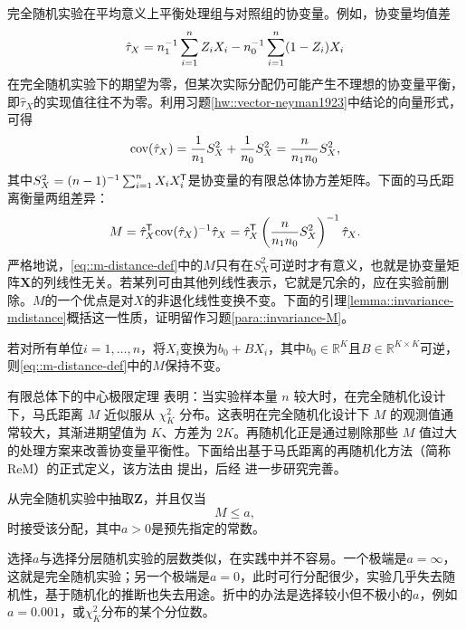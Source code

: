 完全随机实验在平均意义上平衡处理组与对照组的协变量。例如，协变量均值差
$$
\hat{\tau}_X  = n_1^{-1} \sum_{i=1}^n Z_i X_i - n_0^{-1} \sum_{i=1}^n (1-Z_i) X_i
$$
在完全随机实验下的期望为零，但某次实际分配仍可能产生不理想的协变量平衡，即$\hat{\tau}_X  $的实现值往往不为零。利用习题\ref{hw::vector-neyman1923}中\citet{Neyman:1923}结论的向量形式，可得
$$
\textup{cov}(\hat{\tau}_X  ) 
= \frac{1}{n_1}  S_X^2  + \frac{1}{n_0}  S_X^2   
=  \frac{n}{n_1 n_0} S_X^2   ,
$$
其中$ S_X^2   = (n-1)^{-1} \sum_{i=1}^n  X_i X_i^{\mkern-1.5mu\mathsf{T}} $是协变量的有限总体协方差矩阵。下面的马氏距离衡量两组差异：
\begin{equation}
\label{eq::m-distance-def}
M = \hat{\tau}_X ^{\mkern-1.5mu\mathsf{T}} \textup{cov}(\hat{\tau}_X  )^{-1} \hat{\tau}_X  = \hat{\tau}_X ^{\mkern-1.5mu\mathsf{T}}  \left(  \frac{n}{n_1 n_0} S_X^2   \right)^{-1} \hat{\tau}_X  . 
\end{equation}
严格地说，\eqref{eq::m-distance-def}中的$M$只有在$S_X^2 $可逆时才有意义，也就是协变量矩阵$\bm{X}$的列线性无关。若某列可由其他列线性表示，它就是冗余的，应在实验前删除。$M$的一个优点是对$X$的非退化线性变换不变。下面的引理\ref{lemma::invariance-mdistance}概括这一性质，证明留作习题\ref{para::invariance-M}。 

\begin{lemma}\label{lemma::invariance-mdistance}
若对所有单位$i=1,\ldots, n$，将$X_i$变换为$b_0  + BX_i$，其中$b_0  \in \mathbb{R}^K$且$B \in \mathbb{R}^{K\times K}$可逆，则\eqref{eq::m-distance-def}中的$M$保持不变。 
\end{lemma}




有限总体下的中心极限定理 \citep{li2017general} 表明：当实验样本量 $n$ 较大时，在完全随机化设计下，马氏距离 $M $ 近似服从 $ \chi^2_K$ 分布。这表明在完全随机化设计下 $M$ 的观测值通常较大，其渐进期望值为 $K$、方差为 $2K$。再随机化正是通过剔除那些 $M$ 值过大的处理方案来改善协变量平衡性。下面给出基于马氏距离的再随机化方法（简称 ReM）的正式定义，该方法由 \citet{cox:1982} 提出，后经 \citet{morgan2012rerandomization} 进一步研究完善。 


\begin{definition}
[ReM]
从完全随机实验中抽取$\bm{Z}$，并且仅当
$$
M \leq a,
$$
时接受该分配，其中$a > 0$是预先指定的常数。 
\end{definition}



选择$a$与选择分层随机实验的层数类似，在实践中并不容易。一个极端是$a = \infty$，这就是完全随机实验；另一个极端是$a=0$，此时可行分配很少，实验几乎失去随机性，基于随机化的推断也失去用途。折中的办法是选择较小但不极小的$a$，例如$a=0.001$，或$\chi^2_K$分布的某个分位数。 


